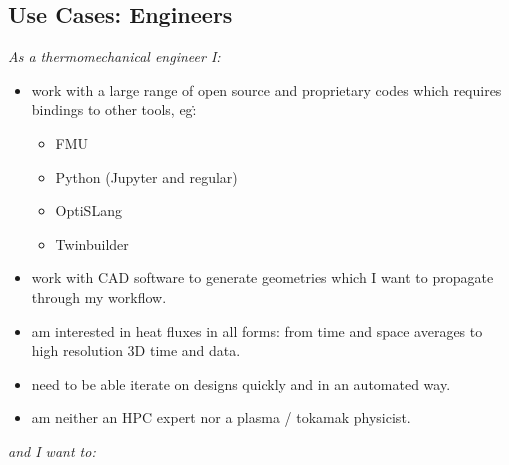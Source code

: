 \subsection{Use Cases: Engineers}\label{sec:use-cases-engineers}

\emph{As a thermomechanical engineer I:}

\begin{itemize}
\item work with a large range of open source and proprietary codes which
  requires bindings to other tools, eg\.:

  \begin{itemize}
  \item FMU
  \item Python (Jupyter and regular)
  \item OptiSLang
  \item Twinbuilder
  \end{itemize}
\item work with CAD software to generate geometries which I want to
  propagate through my workflow.
\item am interested in heat fluxes in all forms: from time and space
  averages to high resolution 3D time and data.
\item need to be able iterate on designs quickly and in an automated way.
\item am neither an HPC expert nor a plasma / tokamak physicist.
\end{itemize}

\emph{and I want to:}

